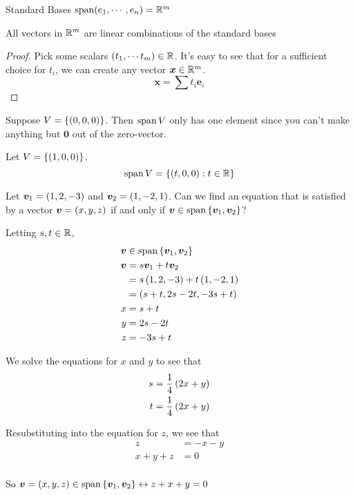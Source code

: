 \documentclass[11pt]{article}
\begin{document}
\begin{theorem}{Standard Bases}
  $\operatorname{span} (e_1, \cdots, e_n) = \mathbb R^m$
  
  All vectors in $\mathbb R^m$ are linear combinations of the standard bases
  \begin{proof}
    Pick some scalars $\left ( t_1, \cdots t_m \right) \in \mathbb R$.
    It's easy to see that for a sufficient choice for $t_i$, we can create any vector $\bm{x} \in \mathbb{R}^m$.
    $$
    \bm{x} = \sum t_i \bm{e}_i
    $$
  \end{proof}
\end{theorem}



\begin{example}
  
  Suppose $V = \left \{ \left ( 0, 0, 0 \right) \right \}$.
  Then $\operatorname{span} V$ only has one element since you can't make anything but $\bm{0}$ out of the zero-vector.
\end{example}

\begin{example}

  Let $V = \left \{ \left ( 1, 0, 0 \right) \right \}$.
  $$
  \operatorname{span} V = \left \{ \left ( t, 0, 0 \right) : t \in \mathbb R \right \}
  $$
\end{example}

\begin{example}
  
  Let $\bm{v}_1 = \left ( 1, 2, -3 \right)$ and $\bm{v}_2 = \left ( 1, -2, 1 \right)$.
  Can we find an equation that is satisfied by a vector $\bm{v} = \left ( x, y, z \right)$ if and only if $\bm{v} \in \operatorname{span} \left \{ \bm{v}_1, \bm{v}_2 \right \}$?

  Letting $s,t \in \mathbb R$,
  \begin{align*}
    \bm{v} &\in \operatorname{span} \left \{ \bm{v}_1, \bm{v}_2 \right \} \\
    \bm{v} &= s \bm{v}_1 + t \bm{v}_2 \\
           &= s \left ( 1,2,-3 \right) + t \left ( 1, -2, 1 \right) \\
           &= \left ( s+t, 2s-2t, -3s+t \right) \\
    x &= s+t \\
    y &= 2s-2t \\
    z &= -3s+t \\
  \end{align*}

  We solve the equations for $x$ and $y$ to see that
  \begin{align*}
    s &= \frac{1}{4} \left ( 2x+y \right) \\
    t &= \frac{1}{4} \left ( 2x+y \right) \\
  \end{align*}

  Resubstituting into the equation for $z$, we see that
  \begin{align*}
    z &= -x-y \\
    x+y+z &= 0 \\
  \end{align*}

  So $\bm{v} = \left ( x, y, z \right) \in \operatorname{span} \left \{ \bm{v}_1, \bm{v}_2 \right \} \leftrightarrow z+x+y=0$
\end{example}
\end{document}
